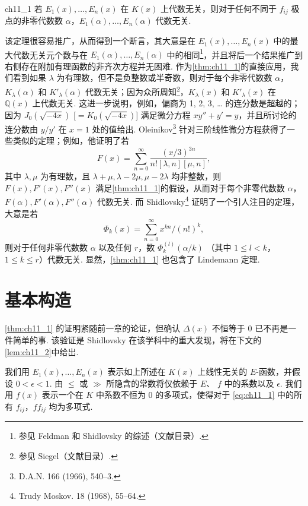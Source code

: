 \begin{mythm}{}{ch11_1}
若 $E_1(x), \dots, E_n(x)$ 在 $K(x)$ 上代数无关，则对于任何不同于 $f_{ij}$ 极点的非零代数数 $\alpha$，$E_1(\alpha), \dots, E_n(\alpha)$ 代数无关.
\end{mythm}

该定理很容易推广，从而得到一个断言，其大意是在 $E_1(x), \ldots, E_n(x)$ 中的最大代数无关元个数与在 $E_1(\alpha), \ldots, E_n(\alpha)$ 中的相同\footnote{参见 Feldman 和 Shidlovsky 的综述（文献目录）. }，并且将后一个结果推广到右侧存在附加有理函数的非齐次方程并无困难. 作为\autoref{thm:ch11_1}的直接应用，我们看到如果 $\lambda$ 为有理数，但不是负整数或半奇数，则对于每个非零代数数 $\alpha$，$K_{\lambda}(\alpha)$ 和 $K'_{\lambda}(\alpha)$ 代数无关；因为众所周知\footnote{参见 Siegel（文献目录）. }，$K_{\lambda}(x)$ 和 $K'_{\lambda}(x)$ 在 $\mathbb{Q}(x)$ 上代数无关. 这进一步说明，例如，偏商为 1, 2, 3, \ldots{} 的连分数是超越的；因为 $J_0(\sqrt{-4x})$ [$= K_0(\sqrt{-4x})$] 满足微分方程 $xy'' + y' = y$，并且所讨论的连分数由 $y/y'$ 在 $x = 1$ 处的值给出. Oleinikov\footnote{D.A.N. 166 (1966), 540--3.} 针对三阶线性微分方程获得了一些类似的定理；例如，他证明了若
\[F(x) = \sum_{n=0}^{\infty} \frac{(x/3)^{3n}}{n! [\lambda, n] [\mu, n]},\]
其中 $\lambda, \mu$ 为有理数，且 $\lambda + \mu, \lambda - 2\mu, \mu - 2\lambda$ 均非整数，则 $F(x), F'(x), F''(x)$ 满足\autoref{thm:ch11_1}的假设，从而对于每个非零代数数 $\alpha$，$F(\alpha), F'(\alpha), F''(\alpha)$ 代数无关. 而 Shidlovsky\footnote{Trudy Moskov. 18 (1968), 55--64.} 证明了一个引人注目的定理，大意是若
\[\Phi_k(x) = \sum_{n=0}^{\infty} x^{kn}/(n!)^k,\]
则对于任何非零代数数 $\alpha$ 以及任何 $r$，数 $\Phi_k^{(l)}(\alpha/k)$ （其中 $1 \leq l < k$，$1 \leq k \leq r$）代数无关. 显然，\autoref{thm:ch11_1} 也包含了 Lindemann 定理.

\section{基本构造}\label{sec:ch11_2}

\autoref{thm:ch11_1} 的证明紧随前一章的论证，但确认 $\Delta(x)$ 不恒等于 0 已不再是一件简单的事. 该验证是 Shidlovsky 在该学科中的重大发现，将在下文的\autoref{lem:ch11_2}中给出.

我们用 $E_1(x), \dots, E_n(x)$ 表示如上所述在 $K(x)$ 上线性无关的 $E$-函数，并假设 $0 < \epsilon < 1$. 由 $\leqslant$ 或 $\gg$ 所隐含的常数将仅依赖于 $E$、 $f$ 中的系数以及 $\epsilon$. 我们用 $f(x)$ 表示一个在 $K$ 中系数不恒为 0 的多项式，使得对于 \eqref{eq:ch11_1} 中的所有 $f_{ij}$，$f f_{ij}$ 均为多项式.

